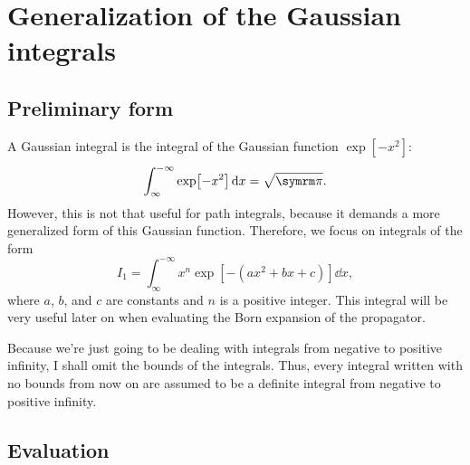 \chapter{Generalization of the Gaussian integrals}

\section{Preliminary form}

A Gaussian integral is the integral of the Gaussian function $\exp[-x^2]$:
\begin{equation}
    \int_{\infty}^{-\infty} \exp[-x^2]\dd{x} = \sqrt{\cpi}.
\end{equation}
However, this is not that useful for path integrals, because it demands a more generalized form of this Gaussian function. Therefore, we focus on integrals of the form
\begin{equation}
    I_1 = \int_{\infty}^{-\infty} x^n\exp[-(ax^2 + bx + c)]\dd{x},\label{eq:generalized_gaussian}
\end{equation}
where $a$, $b$, and $c$ are constants and $n$ is a positive integer. This integral will be very useful later on when evaluating the Born expansion of the propagator.

Because we're just going to be dealing with integrals from negative to positive infinity, I shall omit the bounds of the integrals. Thus, every integral written with no bounds from now on are assumed to be a definite integral from negative to positive infinity.

\section{Evaluation}


